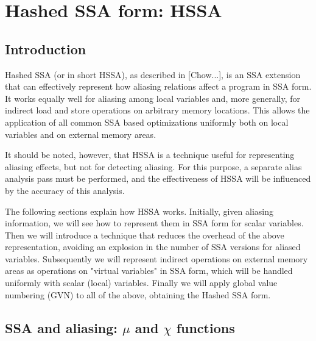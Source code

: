 \chapter{Hashed SSA form: HSSA }


\section{Introduction}

Hashed SSA (or in short HSSA), as described in [Chow...], is an SSA extension that can effectively represent how aliasing relations affect a program in SSA form. It works equally well for aliasing among local variables and, more generally, for indirect load and store operations on arbitrary memory locations. This allows the application of all common SSA based optimizations uniformly both on local variables and on external memory areas.

It should be noted, however, that HSSA is a technique useful for representing aliasing effects, but not for detecting aliasing. For this purpose, a separate alias analysis pass must be performed, and the effectiveness of HSSA will be influenced by the accuracy of this analysis.

The following sections explain how HSSA works. Initially, given aliasing information, we will see how to represent them in SSA form for scalar variables. Then we will introduce a technique that reduces the overhead of the above representation, avoiding an explosion in the number of SSA versions for aliased variables. Subsequently we will represent indirect operations on external memory areas as operations on "virtual variables" in SSA form, which will be handled uniformly with scalar (local) variables.
Finally we will apply global value numbering (GVN) to all of the above, obtaining the Hashed SSA form.


\section{SSA and aliasing: $\mu$ and $\chi$ functions}

